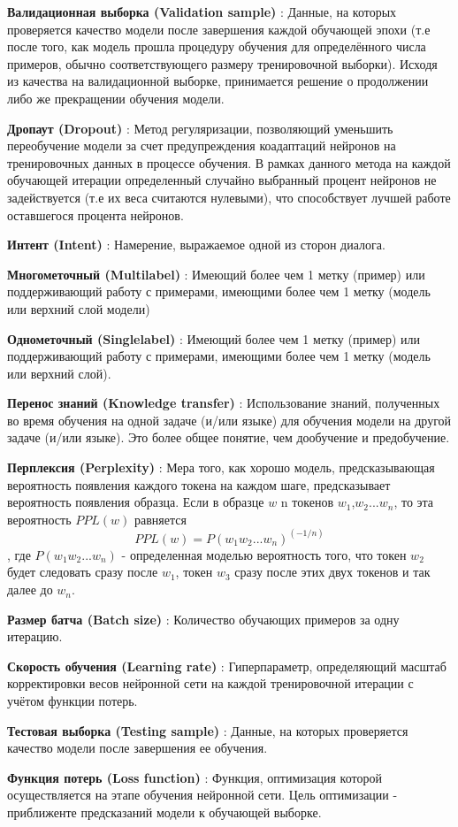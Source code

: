 \textbf{Валидационная выборка (Validation sample)} : Данные, на которых проверяется качество модели после завершения каждой обучающей эпохи (т.е после того, как модель прошла процедуру обучения для определённого числа примеров, обычно соответствующего размеру тренировочной выборки). Исходя из качества на валидационной выборке, принимается решение о продолжении либо же прекращении обучения модели.


\textbf{Дропаут (Dropout)} : Метод регуляризации, позволяющий уменьшить переобучение модели за счет предупреждения коадаптаций нейронов на тренировочных данных в процессе обучения. В рамках данного метода на каждой обучающей итерации определенный случайно выбранный процент нейронов не задействуется (т.е их веса считаются нулевыми), что способствует лучшей работе оставшегося процента нейронов. 

\textbf{Интент (Intent)} : Намерение, выражаемое одной из сторон диалога.

\textbf{Многометочный (Multilabel)} : Имеющий более чем 1 метку (пример) или поддерживающий работу с примерами, имеющими более чем 1 метку (модель или верхний слой модели)

\textbf{Однометочный (Singlelabel)} : Имеющий более чем 1 метку (пример) или поддерживающий работу с примерами, имеющими более чем 1 метку (модель или верхний слой).

\textbf{Перенос знаний (Knowledge transfer)} : Использование знаний, полученных во время обучения на одной задаче (и/или языке) для обучения модели на другой задаче (и/или языке). Это более общее понятие, чем дообучение и предобучение.

\textbf{Перплексия (Perplexity)} : Мера того, как хорошо модель, предсказывающая вероятность появления каждого токена на каждом шаге, предсказывает вероятность появления образца. Если в образце $w$ n токенов $w_1$,$w_2$...$w_n$, то эта вероятность $PPL(w)$ равняется
\begin{equation} 
PPL(w) = P(w_1w_2... w_n)^{(-1/n)}
\end{equation},
где $P(w_1w_2... w_n)$ - определенная моделью вероятность того, что токен $w_2$ будет следовать сразу после $w_1$, токен $w_3$ сразу после этих двух токенов и так далее до $w_n$. 

\textbf{Размер батча (Batch size)} : Количество обучающих примеров за одну итерацию.

\textbf{Скорость обучения (Learning rate)} : Гиперпараметр, определяющий масштаб корректировки весов нейронной сети на каждой тренировочной итерации с учётом функции потерь.

\textbf{Тестовая выборка (Testing sample)} : Данные, на которых проверяется качество модели после завершения ее обучения.

\textbf{Функция потерь (Loss function)} : Функция, оптимизация которой осуществляется на этапе обучения нейронной сети. Цель оптимизации - приближенте предсказаний модели к обучающей выборке.

